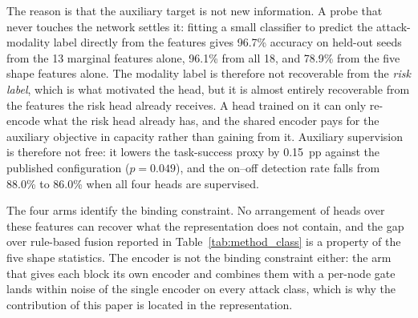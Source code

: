 \documentclass[notspecified,article,submit,moreauthors]{Definitions/mdpi}
\begin{document}
The reason is that the auxiliary target is not new information. A probe that never touches the network settles it: fitting a small classifier to predict the attack-modality label directly from the features gives 96.7\% accuracy on held-out seeds from the 13 marginal features alone, 96.1\% from all 18, and 78.9\% from the five shape features alone. The modality label is therefore not recoverable from the \emph{risk label}, which is what motivated the head, but it is almost entirely recoverable from the features the risk head already receives. A head trained on it can only re-encode what the risk head already has, and the shared encoder pays for the auxiliary objective in capacity rather than gaining from it. Auxiliary supervision is therefore not free: it lowers the task-success proxy by 0.15~pp against the published configuration ($p=0.049$), and the on--off detection rate falls from 88.0\% to 86.0\% when all four heads are supervised.

The four arms identify the binding constraint. No arrangement of heads over these features can recover what the representation does not contain, and the gap over rule-based fusion reported in Table~\ref{tab:method_class} is a property of the five shape statistics. The encoder is not the binding constraint either: the arm that gives each block its own encoder and combines them with a per-node gate lands within noise of the single encoder on every attack class, which is why the contribution of this paper is located in the representation.
\end{document}
